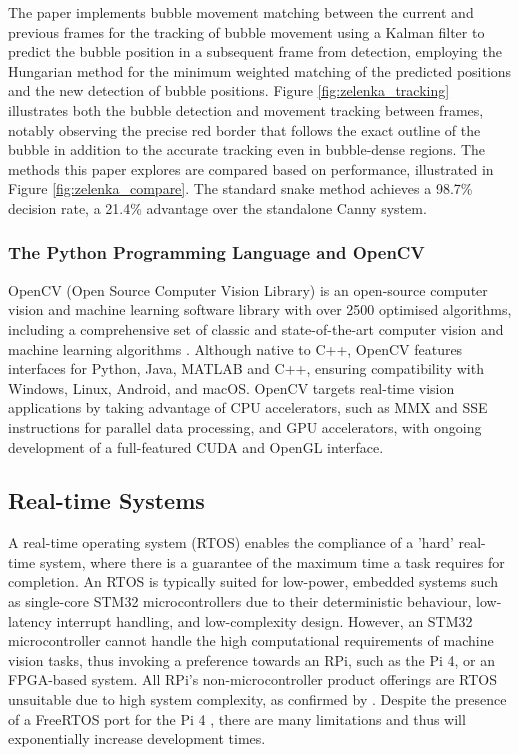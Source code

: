 The paper implements bubble movement matching between the current and previous frames for the tracking of bubble movement using a Kalman filter \cite{kalmanNewApproachLinear1960} to predict the bubble position in a subsequent frame from detection, employing the Hungarian method \cite{kuhnHungarianMethodAssignment1955} for the minimum weighted matching of the predicted positions and the new detection of bubble positions. Figure \ref{fig:zelenka_tracking} illustrates both the bubble detection and movement tracking between frames, notably observing the precise red border that follows the exact outline of the bubble in addition to the accurate tracking even in bubble-dense regions. The methods this paper explores are compared based on performance, illustrated in Figure \ref{fig:zelenka_compare}. The standard snake method achieves a 98.7\% decision rate, a 21.4\% advantage over the standalone Canny system.

\subsubsection{The Python Programming Language and OpenCV}
OpenCV (Open Source Computer Vision Library) is an open-source computer vision and machine learning software library with over 2500 optimised algorithms, including a comprehensive set of classic and state-of-the-art computer vision and machine learning algorithms \cite{opencv}. Although native to C++, OpenCV features interfaces for Python, Java, MATLAB and C++, ensuring compatibility with Windows, Linux, Android, and macOS. OpenCV targets real-time vision applications by taking advantage of CPU accelerators, such as MMX and SSE instructions for parallel data processing, and GPU accelerators, with ongoing development of a full-featured CUDA and OpenGL interface.

\subsection{Real-time Systems}
A real-time operating system (RTOS) enables the compliance of a 'hard' real-time system, where there is a guarantee of the maximum time a task requires for completion. An RTOS is typically suited for low-power, embedded systems such as single-core STM32 microcontrollers due to their deterministic behaviour, low-latency interrupt handling, and low-complexity design. However, an STM32 microcontroller cannot handle the high computational requirements of machine vision tasks, thus invoking a preference towards an RPi, such as the Pi 4, or an FPGA-based system. All RPi's non-microcontroller product offerings are RTOS unsuitable due to high system complexity, as confirmed by \cite{FreeRTOSRaspberry2022}. Despite the presence of a FreeRTOS port for the Pi 4 \cite{timadaTImadaRaspi4_freertos2024}, there are many limitations and thus will exponentially increase development times.

